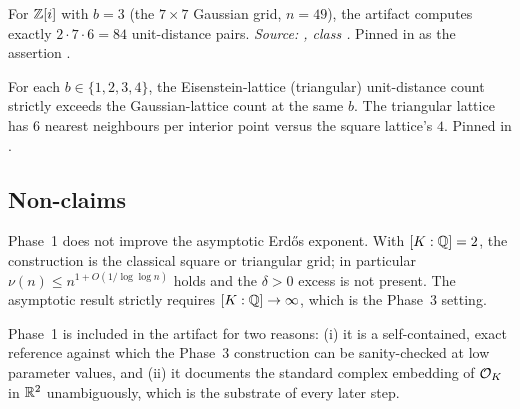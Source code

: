 \begin{verification}\label{ver:gauss_7x7}
For $\mathbb{Z}[i]$ with $b = 3$ (the $7 \times 7$ Gaussian grid, $n = 49$),
the artifact computes exactly $2 \cdot 7 \cdot 6 = 84$ unit-distance
pairs.
\textit{Source:
,
class .}
Pinned in  as the assertion
.
\end{verification}

\begin{verification}\label{ver:eisenstein_dominance}
For each $b \in \{1, 2, 3, 4\}$, the Eisenstein-lattice (triangular)
unit-distance count strictly exceeds the Gaussian-lattice count at the
same $b$. The triangular lattice has $6$ nearest neighbours per
interior point versus the square lattice's $4$. Pinned in
.
\end{verification}

\subsection{Non-claims}

Phase~1 does not improve the asymptotic Erd\H{o}s exponent. With
$[K : \mathbb{Q}] = 2$, the construction is the classical square or triangular
grid; in particular $\nu(n) \leq n^{1 + O(1/\log \log n)}$ holds and the
$\delta > 0$ excess is not present. The asymptotic result strictly
requires $[K : \mathbb{Q}] \to \infty$, which is the Phase~3 setting.

Phase~1 is included in the artifact for two reasons: (i) it is a
self-contained, exact reference against which the Phase~3 construction
can be sanity-checked at low parameter values, and (ii) it documents
the standard complex embedding of $\mathcal{O}_K$ in $\mathbb{R}^2$ unambiguously, which
is the substrate of every later step.
